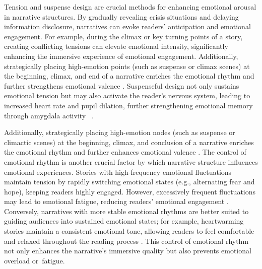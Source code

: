 Tension and suspense design are crucial methods for enhancing emotional arousal in narrative structures. By gradually revealing crisis situations and delaying information disclosure, narratives can evoke readers’ anticipation and emotional engagement. For example, during the climax or key turning points of a story, creating conflicting tensions can elevate emotional intensity, significantly enhancing the immersive experience of emotional engagement. Additionally, strategically placing high-emotion points (such as suspense or climax scenes) at the beginning, climax, and end of a narrative enriches the emotional rhythm and further strengthens emotional valence \cite{jaaskelainen2020neural}. Suspenseful design not only sustains emotional tension but may also activate the reader’s nervous system, leading to increased heart rate and pupil dilation, further strengthening emotional memory through amygdala activity~\cite{panksepp2012archeology, jaaskelainen2020neural} .

Additionally, strategically placing high-emotion nodes (such as suspense or climactic scenes) at the beginning, climax, and conclusion of a narrative enriches the emotional rhythm and further enhances emotional valence \cite{jaaskelainen2020neural}. The control of emotional rhythm is another crucial factor by which narrative structure influences emotional experiences. Stories with high-frequency emotional fluctuations maintain tension by rapidly switching emotional states (e.g., alternating fear and hope), keeping readers highly engaged. However, excessively frequent fluctuations may lead to emotional fatigue, reducing readers’ emotional engagement \cite{lekkas2022using}. Conversely, narratives with more stable emotional rhythms are better suited to guiding audiences into sustained emotional states; for example, heartwarming stories maintain a consistent emotional tone, allowing readers to feel comfortable and relaxed throughout the reading process \cite{jaaskelainen2020neural}. This control of emotional rhythm not only enhances the narrative’s immersive quality but also prevents emotional overload or~fatigue.

